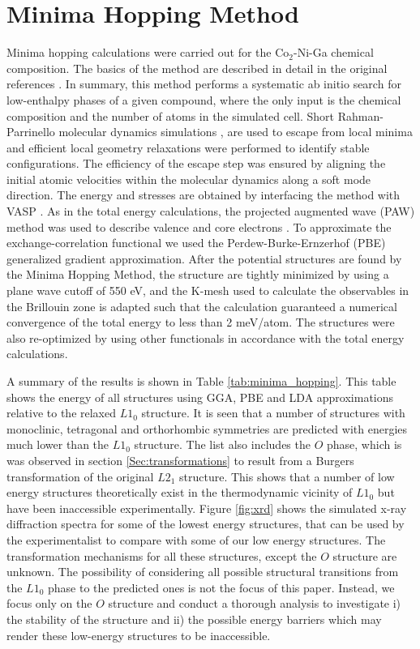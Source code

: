 \documentclass[%
preprint,
 amsmath,amssymb,
 aps,
prb,
showkeys,
]{revtex4-1}
\begin{document}
\section{Minima Hopping Method}
\label{Sec:MHM}
Minima hopping calculations were carried out for the Co$_2$-Ni-Ga chemical composition. The basics of the method are described in detail in the original references \cite{Goedecker2004,Amsler2010}. In summary, this method
performs a systematic ab initio search for low-enthalpy phases of a given compound, where the only input is the chemical composition and the number of atoms in the simulated cell.
Short Rahman-Parrinello molecular dynamics simulations \cite{parrinello1981polymorphic}, are used to escape from local minima and 
efficient local geometry relaxations were performed to identify stable configurations. The efficiency of the escape step was ensured by aligning the initial atomic velocities within the molecular dynamics along a soft mode direction.
The energy and stresses are obtained by interfacing the method with VASP \cite{Kresse1996}. As in the total energy calculations, the projected augmented wave (PAW) method was used to describe valence and core electrons \cite{blochl1994}. To approximate the exchange-correlation functional we used the
Perdew-Burke-Ernzerhof (PBE) \cite{Perdew1996} generalized gradient
approximation. After the potential structures are found by the Minima Hopping Method, the structure are tightly minimized by using a plane wave cutoff of 550 eV, and the K-mesh used to calculate the observables in the Brillouin zone is adapted such that the calculation guaranteed a numerical convergence of the total energy to less than 2 meV/atom. The structures were also re-optimized by using other functionals in accordance with the total energy calculations.

A summary of the results is shown in Table \ref{tab:minima_hopping}. This table shows the energy of all structures using GGA\cite{Perdew1992}, PBE\cite{Perdew1996} and LDA\cite{LDA} approximations relative to the relaxed  $L1_0$ structure.
It is seen that a number of structures with monoclinic, tetragonal and orthorhombic symmetries are predicted with energies much lower than the $L1_0$ structure. The list also includes the $O$ phase, which is was observed in section \ref{Sec:transformations} to result from a Burgers transformation of the original $L2_1$ structure. This shows that a number of low energy structures theoretically exist in the thermodynamic vicinity of $L1_0$ but have been inaccessible experimentally. Figure \ref{fig:xrd} shows the simulated x-ray diffraction  spectra for some of the lowest energy structures, that can be used by the experimentalist to compare with some of our low energy structures. The transformation mechanisms for all these structures, except the $O$ structure are unknown. The possibility of considering all possible structural transitions from the $L1_0$ phase to the predicted ones is not the focus of this paper. Instead, we  focus only on the  $O$  structure and conduct a thorough analysis to investigate i) the 
stability of the structure and ii) the possible energy barriers which may render these low-energy structures  to be inaccessible.
\end{document}
